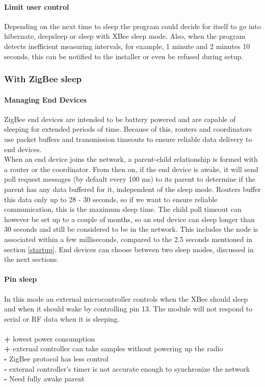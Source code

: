 \paragraph{Limit user control}
Depending on the next time to sleep the program could decide for itself to go into hibernate, deepsleep or sleep with XBee sleep mode. Also, when the program detects inefficient measuring intervals, for example, 1 minute and 2 minutes 10 seconds, this can be notified to the installer or even be refused during setup.
\subsubsection{With ZigBee sleep}
\paragraph{Managing End Devices}
ZigBee end devices are intended to be battery powered and are capable of sleeping for extended periods of time. Because of this, routers and coordinators use packet buffers and transmission timeouts to ensure reliable data delivery to end devices.\\
When an end device joins the network, a parent-child relationship is formed with a router or the coordinator. From then on, if the end device is awake, it will send poll request messages (by default every 100 ms) to its parent to determine if the parent has any data buffered for it, independent of the sleep mode. Routers buffer this data only up to 28 - 30 seconds, so if we want to ensure reliable communication, this is the maximum sleep time. The child poll timeout can however be set up to a couple of months, so an end device can sleep longer than 30 seconds and still be considered to be in the network. This includes the node is associated within a few milliseconds, compared to the 2.5 seconds mentioned in section \ref{startup}. End devices can choose between two sleep modes, discussed in the next sections. 
\paragraph{Pin sleep}
In this mode an external microcontroller controls when the XBee should sleep and when it should wake by controlling pin 13. The module will not respond to serial or RF data when it is sleeping.\\\\
\textbf{+} lowest power consumption\\
\textbf{+} external controller can take samples without powering up the radio\\
\textbf{-} ZigBee protocol has less control\\
\textbf{-} external controller's timer is not accurate enough to synchronize the network\\
\textbf{-} Need fully awake parent\\
